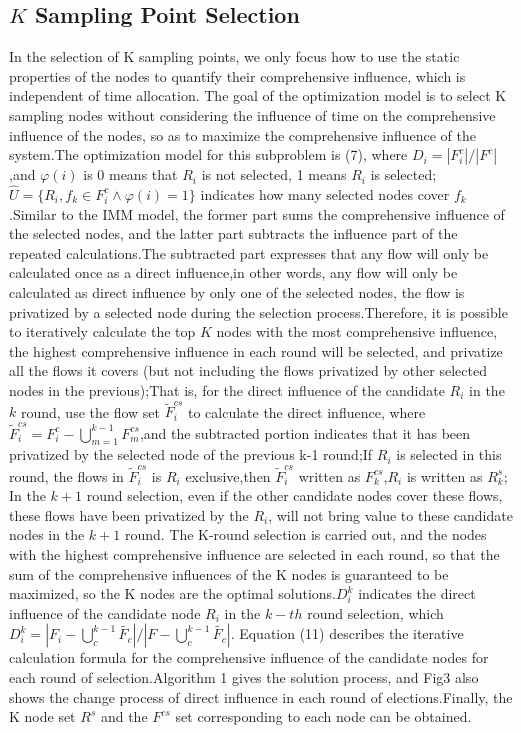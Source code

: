 \documentclass[conference,compsoc]{IEEEtran}
\begin{document}
\subsection{$K$ Sampling Point Selection} 
In the selection of K sampling points, we only focus how to use the static properties of the nodes to quantify their comprehensive influence, which is independent of time allocation. The goal of the optimization model is to select K sampling nodes without considering the influence of time on the comprehensive influence of the nodes, so as to maximize the comprehensive influence of the system.The optimization model for this subproblem is (7), where $D_i=|F^c_i|/|F^c|$,and $\varphi(i)$ is 0 means that $R_i$ is not selected, 1 means $R_i$ is selected; $\widehat{U} = \{R_i,f_k \in F^c_i \wedge \varphi(i) = 1\}$ indicates how many selected nodes cover $f_k$.Similar to the IMM model, the former part sums the comprehensive influence of the selected nodes, and the latter part subtracts the influence part of the repeated calculations.The subtracted part expresses that any flow will only be calculated once as a direct influence,in other words, any flow will only be calculated as direct influence by only one of the selected nodes, the flow is privatized by a selected node during the selection process.Therefore, it is possible to iteratively calculate the top $K$ nodes with the most comprehensive influence, the highest comprehensive influence in each round will be selected, and privatize all the flows it covers (but not including the flows privatized by other selected nodes in the previous);That is, for the direct influence of the candidate $R_i$ in the $k$ round, use the flow set $\widetilde{F}^{cs}_i$ to calculate the direct influence, where $\widetilde{F}^{cs}_i = F_i^c- \bigcup_{m=1}^{k-1}F_m^{cs}$,and the subtracted portion indicates that it has been privatized by the selected node of the previous k-1 round;If $R_i$ is selected in this round,  the flows in $\widetilde{F}^{cs}_i$ is $R_i$ exclusive,then $\widetilde{F}^{cs}_i$ written as $F^{cs}_k$,$R_i$ is written as $R^s_k$; In the $k+1$ round selection, even if the other candidate nodes cover these flows, these flows have been privatized by the $R_i$, will not bring value to these candidate nodes in the $k+1$ round. The K-round selection is carried out, and the nodes with the highest comprehensive influence are selected in each round, so that the sum of the comprehensive influences of the K nodes is guaranteed to be maximized, so the K nodes are the optimal solutions.$D_i^k$ indicates the direct influence of the candidate node $R_i$ in the $k-th$ round selection, which $D_i^k = {\left| {{F}_{i}}-\bigcup\nolimits_{c}^{k-1}{\widetilde{{{F}_{c}}}} \right|}/{\left| F-\bigcup\nolimits_{c}^{k-1}{\widetilde{{{F}_{c}}}} \right|}$. Equation (11) describes the iterative calculation formula for the comprehensive influence of the candidate nodes for each round of selection.Algorithm 1 gives the solution process, and Fig3 also shows the change process of direct influence in each round of elections.Finally, the K node set $R^s$ and the $F^{cs}$ set corresponding to each node can be obtained.
\end{document}

